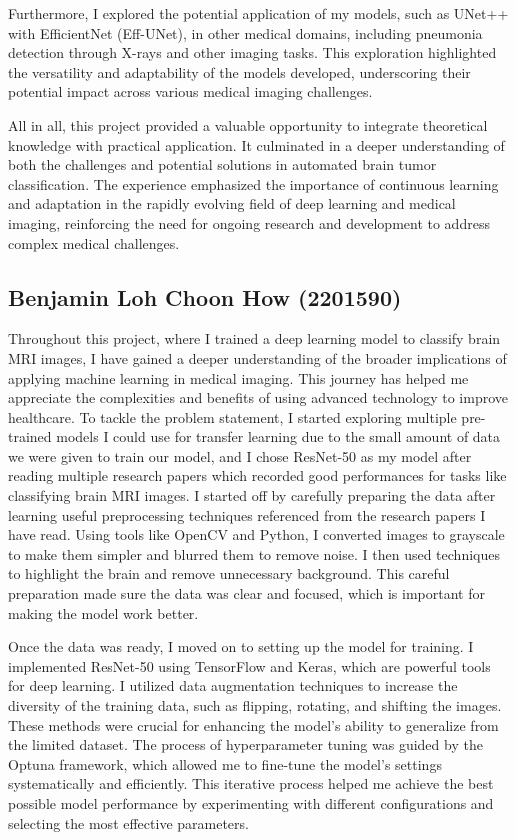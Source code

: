 Furthermore, I explored the potential application of my models, such as UNet++ with EfficientNet (Eff-UNet), in other medical domains, including pneumonia detection through X-rays and other imaging tasks. This exploration highlighted the versatility and adaptability of the models developed, underscoring their potential impact across various medical imaging challenges.

All in all, this project provided a valuable opportunity to integrate theoretical knowledge with practical application. It culminated in a deeper understanding of both the challenges and potential solutions in automated brain tumor classification. The experience emphasized the importance of continuous learning and adaptation in the rapidly evolving field of deep learning and medical imaging, reinforcing the need for ongoing research and development to address complex medical challenges.

\subsection{Benjamin Loh Choon How (2201590)}\label{ss:blch}

Throughout this project, where I trained a deep learning model to classify brain MRI images, I have gained a deeper understanding of the broader implications of applying machine learning in medical imaging. This journey has helped me appreciate the complexities and benefits of using advanced technology to improve healthcare. To tackle the problem statement, I started exploring multiple pre-trained models I could use for transfer learning due to the small amount of data we were given to train our model, and I chose ResNet-50 as my model after reading multiple research papers which recorded good performances for tasks like classifying brain MRI images. I started off by carefully preparing the data after learning useful preprocessing techniques referenced from the research papers I have read. Using tools like OpenCV and Python, I converted images to grayscale to make them simpler and blurred them to remove noise. I then used techniques to highlight the brain and remove unnecessary background. This careful preparation made sure the data was clear and focused, which is important for making the model work better.

Once the data was ready, I moved on to setting up the model for training. I implemented ResNet-50 using TensorFlow and Keras, which are powerful tools for deep learning. I utilized data augmentation techniques to increase the diversity of the training data, such as flipping, rotating, and shifting the images. These methods were crucial for enhancing the model’s ability to generalize from the limited dataset. The process of hyperparameter tuning was guided by the Optuna framework, which allowed me to fine-tune the model's settings systematically and efficiently. This iterative process helped me achieve the best possible model performance by experimenting with different configurations and selecting the most effective parameters.

